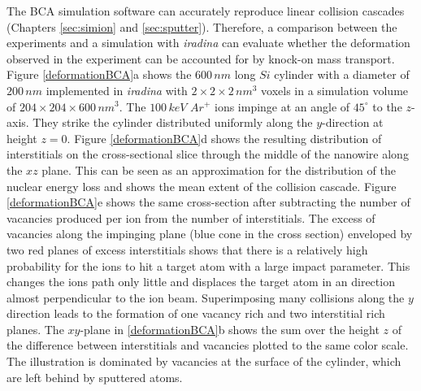 The BCA simulation software can accurately reproduce linear collision cascades (Chapters \ref{sec:simion} and \ref{sec:sputter}). Therefore, a comparison between the experiments and a simulation with \emph{iradina} can evaluate whether the deformation observed in the experiment can be accounted for by knock-on mass transport. Figure \ref{deformationBCA}a shows the $600\,nm$ long $Si$ cylinder with a diameter of $200\,nm$ implemented in \emph{iradina} with $2\times2\times2\,nm^3$ voxels in a simulation volume of $204\times204\times600\,nm^3$. The $100\,keV\,\,Ar^+$ ions impinge at an angle of $45^\circ$ to the $z$-axis. They strike the cylinder distributed uniformly along the $y$-direction at height $z=0$. Figure \ref{deformationBCA}d shows the resulting distribution of interstitials on the cross-sectional slice through the middle of the nanowire along the $xz$ plane. This can be seen as an approximation for the distribution of the nuclear energy loss and shows the mean extent of the collision cascade. Figure \ref{deformationBCA}e shows the same cross-section after subtracting the number of vacancies produced per ion from the number of interstitials. The excess of vacancies along the impinging plane (blue cone in the cross section) enveloped by two red planes of excess interstitials shows that there is a relatively high probability for the ions to hit a target atom with a large impact parameter. This changes the ions path only little and displaces the target atom in an direction almost perpendicular to the ion beam. Superimposing many collisions along the $y$ direction leads to the formation of one vacancy rich and two interstitial rich planes. The $xy$-plane in \ref{deformationBCA}b shows the sum over the height $z$ of the difference between interstitials and vacancies plotted to the same color scale. The illustration is dominated by vacancies at the surface of the cylinder, which are left behind by sputtered atoms. 


